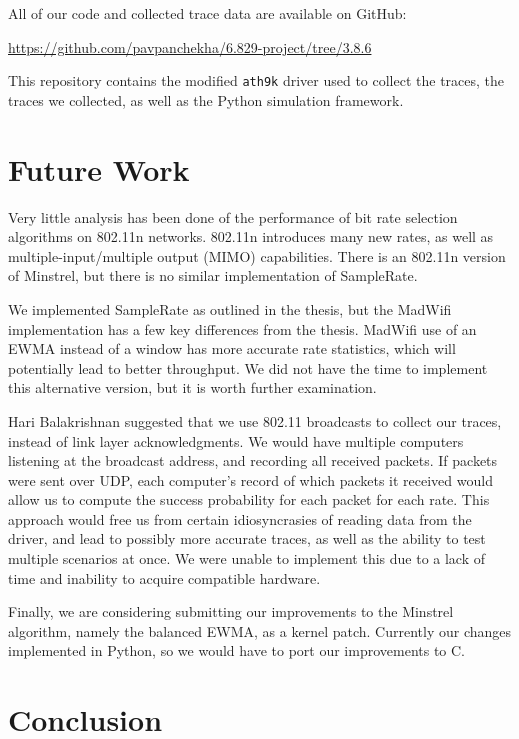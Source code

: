 \documentclass[twocolumn,10pt]{article}
\begin{document}
All of our code and collected trace data are available on GitHub:

\noindent
{\small\url{https://github.com/pavpanchekha/6.829-project/tree/3.8.6}}

This repository contains the modified \texttt{ath9k} driver used to
collect the traces, the traces we collected, as well as the Python
simulation framework.

\section{Future Work} \label{sec:future-work}

Very little analysis has been done of the performance of bit rate
selection algorithms on 802.11n networks.  802.11n introduces many new
rates, as well as multiple-input/multiple output (MIMO) capabilities.
There is an 802.11n version of Minstrel, but there is no similar
implementation of SampleRate.

We implemented SampleRate as outlined in the thesis, but the MadWifi
implementation has a few key differences from the thesis.  MadWifi use
of an EWMA instead of a window has more accurate rate statistics,
which will potentially lead to better throughput.  We did not have the
time to implement this alternative version, but it is worth further
examination.

Hari Balakrishnan suggested that we use 802.11 broadcasts to collect
our traces, instead of link layer acknowledgments.  We would have
multiple computers listening at the broadcast address, and recording
all received packets.  If packets were sent over UDP, each computer's
record of which packets it received would allow us to compute the
success probability for each packet for each rate.  This approach
would free us from certain idiosyncrasies of reading data from the
driver, and lead to possibly more accurate traces, as well as the
ability to test multiple scenarios at once.  We were unable to
implement this due to a lack of time and inability to acquire
compatible hardware.

Finally, we are considering submitting our improvements to the
Minstrel algorithm, namely the balanced EWMA, as a kernel patch.
Currently our changes implemented in Python, so we would have to port
our improvements to C.

\section{Conclusion} \label{sec:conclusion}
\end{document}
